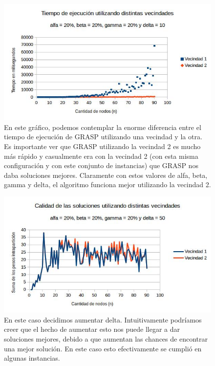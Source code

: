\documentclass[a4paper]{article}
\begin{document}
\begin{figure}[H]
\centering
\includegraphics[scale=0.7]{20202010c.jpg}\caption{En este gráfico, podemos contemplar la enorme diferencia entre el tiempo de ejecución de GRASP utilizando una vecindad y la otra. Es importante ver que GRASP utilizando la vecindad 2 es mucho más rápido y casualmente era con la vecindad 2 (con esta misma configuración y con este conjunto de instancias) que GRASP nos daba soluciones mejores. Claramente con estos valores de alfa, beta, gamma y delta, el algoritmo funciona mejor utilizando la vecindad 2.}
\end{figure}

\begin{figure}[H]
\centering
\includegraphics[scale=0.7]{20202050.jpg}\caption{
\noindent En este caso decidimos aumentar delta. Intuitivamente podríamos creer que el hecho de aumentar esto nos puede llegar a dar soluciones mejores, debido a que aumentan las chances de encontrar una mejor solución. En este caso esto efectivamente se cumplió en algunas instancias.}
\end{figure}
\end{document}
